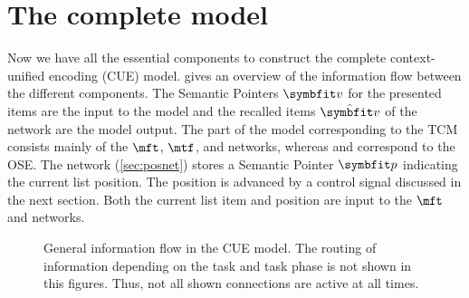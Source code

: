\chapter{The complete model}

Now we have all the essential components to construct the complete context-unified encoding (CUE) model.
 gives an overview of the information flow between the different components.
The Semantic Pointers $\vc v$ for the presented items are the input to the model and the recalled items $\hat{\vc v}$ of the  network are the model output.
The part of the model corresponding to the TCM consists mainly of the $\mft$, $\mtf$, and  networks, whereas  and  correspond to the OSE\@.
The  network (\cref{sec:posnet}) stores a Semantic Pointer $\vc p$ indicating the current list position.
The position is advanced by a control signal discussed in the next section.
Both the current list item and position are input to the $\mft$ and  networks.
\begin{figure}
    \centering
    \caption[General information flow in the CUE model]{General information flow in the CUE model. The routing of information depending on the task and task phase is not shown in this figures. Thus, not all shown connections are active at all times.}\label{fig:general-routing}
\end{figure}

